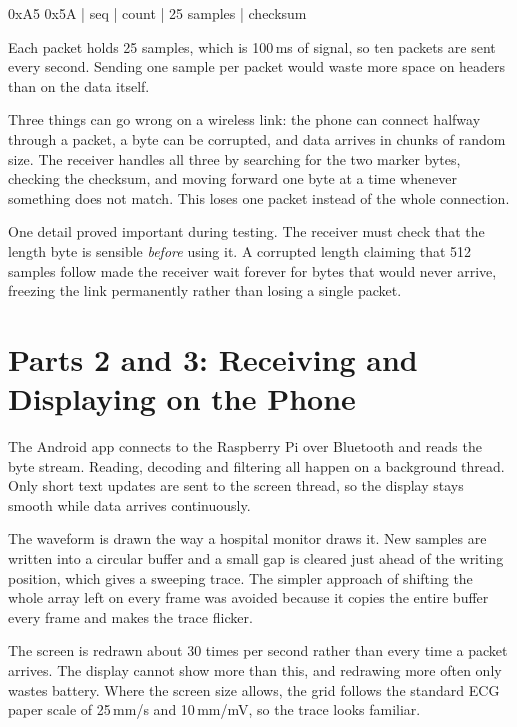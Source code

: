 \documentclass[conference]{IEEEtran}
\begin{document}
\begin{center}\footnotesize\ttfamily
0xA5 0x5A | seq | count | 25 samples | checksum
\end{center}

Each packet holds 25 samples, which is 100\,ms of signal, so ten packets are
sent every second. Sending one sample per packet would waste more space on
headers than on the data itself.

Three things can go wrong on a wireless link: the phone can connect halfway
through a packet, a byte can be corrupted, and data arrives in chunks of random
size. The receiver handles all three by searching for the two marker bytes,
checking the checksum, and moving forward one byte at a time whenever something
does not match. This loses one packet instead of the whole connection.

One detail proved important during testing. The receiver must check that the
length byte is sensible \emph{before} using it. A corrupted length claiming that
512 samples follow made the receiver wait forever for bytes that would never
arrive, freezing the link permanently rather than losing a single packet.

\section{Parts 2 and 3: Receiving and Displaying on the Phone}
\label{sec:part23}

The Android app connects to the Raspberry Pi over Bluetooth and reads the byte
stream. Reading, decoding and filtering all happen on a background thread. Only
short text updates are sent to the screen thread, so the display stays smooth
while data arrives continuously.

The waveform is drawn the way a hospital monitor draws it. New samples are
written into a circular buffer and a small gap is cleared just ahead of the
writing position, which gives a sweeping trace. The simpler approach of shifting
the whole array left on every frame was avoided because it copies the entire
buffer every frame and makes the trace flicker.

The screen is redrawn about 30 times per second rather than every time a packet
arrives. The display cannot show more than this, and redrawing more often only
wastes battery. Where the screen size allows, the grid follows the standard ECG
paper scale of 25\,mm/s and 10\,mm/mV, so the trace looks familiar.
\end{document}
